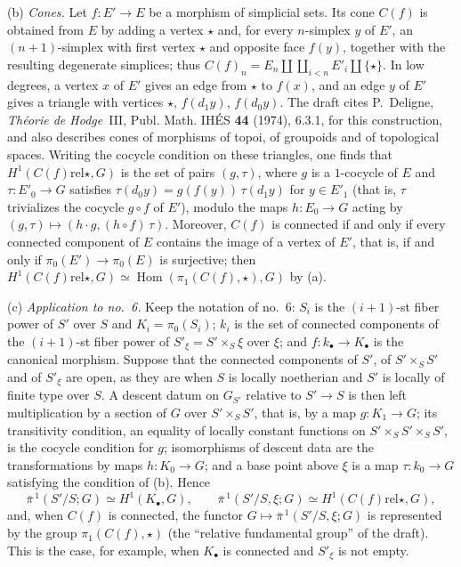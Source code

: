 \par\smallskip\noindent{}(b)
\emph{Cones.} Let \(f:E'\to E\) be a morphism of simplicial sets. Its cone
\(C(f)\) is obtained from \(E\) by adding a vertex \(\star\) and, for
every \(n\)-simplex \(y\) of \(E'\), an \((n+1)\)-simplex with first vertex
\(\star\) and opposite face \(f(y)\), together with the resulting
degenerate simplices; thus
\(C(f)_n=E_n\amalg\coprod_{i<n}E'_i\amalg\{\star\}\). In low degrees, a
vertex \(x\) of \(E'\) gives an edge from \(\star\) to \(f(x)\), and an
edge \(y\) of \(E'\) gives a triangle with vertices \(\star\),
\(f(d_1y)\), \(f(d_0y)\). The draft cites P.~Deligne, \emph{Théorie de
Hodge}~III, Publ. Math. IHÉS \textbf{44} (1974), 6.3.1, for this
construction, and also describes cones of morphisms of topoi, of
groupoids and of topological spaces.
Writing the cocycle condition
on these triangles, one finds that
\(H^1(C(f)\mathbin{\mathrm{rel}}\star,G)\) is the set of pairs
\((g,\tau)\), where \(g\) is a \(1\)-cocycle of \(E\) and
\(\tau:E'_0\to G\) satisfies \(\tau(d_0y)=g(f(y))\,\tau(d_1y)\) for
\(y\in E'_1\) (that is, \(\tau\) trivializes the cocycle \(g\circ f\) of
\(E'\)), modulo the maps \(h:E_0\to G\) acting by
\((g,\tau)\mapsto(h\cdot g,(h\circ f)\,\tau)\). Moreover, \(C(f)\) is
connected if and only if every connected component of \(E\) contains the
image of a vertex of \(E'\), that is, if and only if
\(\pi_0(E')\to\pi_0(E)\) is surjective; then
\(H^1(C(f)\mathbin{\mathrm{rel}}\star,G)\simeq
\operatorname{Hom}(\pi_1(C(f),\star),G)\) by (a).

\par\smallskip\noindent{}(c)
\emph{Application to no.~6.} Keep the notation of no.~6: \(S_i\) is the
\((i+1)\)-st fiber power of \(S'\) over \(S\) and \(K_i=\pi_0(S_i)\);
\(k_i\) is the set of connected components of the \((i+1)\)-st fiber
power of \(S'_\xi=S'\times_S\xi\) over \(\xi\); and
\(f:k_\bullet\to K_\bullet\) is the canonical morphism. Suppose that the
connected components of \(S'\), of \(S'\times_SS'\) and of \(S'_\xi\) are
open, as they are when \(S\) is locally noetherian and \(S'\) is locally
of finite type over \(S\). A descent datum on \(G_{S'}\) relative to
\(S'\to S\) is then left multiplication by a section of \(G\) over
\(S'\times_SS'\), that is, by a map \(g:K_1\to G\); its transitivity
condition, an equality of locally constant functions on
\(S'\times_SS'\times_SS'\), is the cocycle condition for \(g\);
isomorphisms of descent data are the transformations by maps
\(h:K_0\to G\); and a base point above \(\xi\) is a map
\(\tau:k_0\to G\) satisfying the condition of (b). Hence
\[
  \bar\pi^{\,1}(S'/S;G)\simeq H^1(K_\bullet,G),\qquad
  \bar\pi^{\,1}(S'/S,\xi;G)\simeq
  H^1(C(f)\mathbin{\mathrm{rel}}\star,G),
\]
and, when \(C(f)\) is connected, the functor
\(G\mapsto\bar\pi^{\,1}(S'/S,\xi;G)\) is represented by the group
\(\pi_1(C(f),\star)\) (the ``relative fundamental group'' of the draft).
This is the case, for example, when \(K_\bullet\) is connected and
\(S'_\xi\) is not empty.

